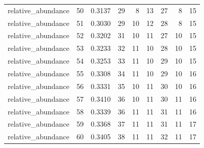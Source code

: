{\begin{longtable}{lrrrrrrrr}
  relative\_abundance & 50 & 0.3137 & 29 & 8 & 13 & 27 & 8 & 15 \\
  relative\_abundance & 51 & 0.3030 & 29 & 10 & 12 & 28 & 8 & 15 \\
  relative\_abundance & 52 & 0.3202 & 31 & 10 & 11 & 27 & 10 & 15 \\
  relative\_abundance & 53 & 0.3233 & 32 & 11 & 10 & 28 & 10 & 15 \\
  relative\_abundance & 54 & 0.3253 & 33 & 11 & 10 & 29 & 10 & 15 \\
  relative\_abundance & 55 & 0.3308 & 34 & 11 & 10 & 29 & 10 & 16 \\
  relative\_abundance & 56 & 0.3331 & 35 & 10 & 11 & 30 & 10 & 16 \\
  relative\_abundance & 57 & 0.3410 & 36 & 10 & 11 & 30 & 11 & 16 \\
  relative\_abundance & 58 & 0.3339 & 36 & 11 & 11 & 31 & 11 & 16 \\
  relative\_abundance & 59 & 0.3368 & 37 & 11 & 11 & 31 & 11 & 17 \\
  relative\_abundance & 60 & 0.3405 & 38 & 11 & 11 & 32 & 11 & 17 \\
\end{longtable}
}
